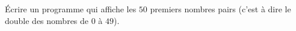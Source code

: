 
\begin{exercice}\label{exoPremiere-0048}

    Écrire un programme qui affiche les \( 50\) premiers nombres pairs (c'est à dire le double des nombres de \( 0\) à \( 49\)).

\end{exercice}
